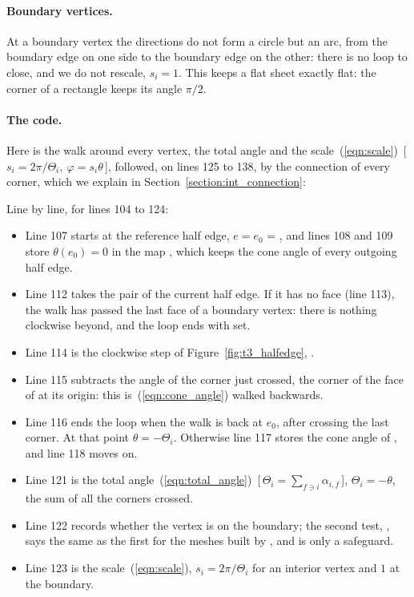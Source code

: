 \paragraph{Boundary vertices.} At a boundary vertex the directions do not form a circle but an arc, from the boundary edge on one side to the boundary edge on the other: there is no loop to close, and we do not rescale, $s_i = 1$. This keeps a flat sheet exactly flat: the corner of a rectangle keeps its angle $\pi/2$.

\paragraph{The code.} Here is the walk around every vertex, the total angle and the scale~(\ref{eqn:scale})~[\,$s_i = 2\pi/\Theta_i,\ \varphi = s_i\theta$\,], followed, on lines 125 to 138, by the connection of every corner, which we explain in Section~\ref{section:int_connection}:

Line by line, for lines 104 to 124:
\begin{itemize}
\item Line 107 starts at the reference half edge, $e = e_0$ = , and lines 108 and 109 store $\theta(e_0) = 0$ in the map , which keeps the cone angle of every outgoing half edge.
\item Line 112 takes the pair of the current half edge. If it has no face (line 113), the walk has passed the last face of a boundary vertex: there is nothing clockwise beyond, and the loop ends with  set.
\item Line 114 is the clockwise step of Figure~\ref{fig:t3_halfedge}, .
\item Line 115 subtracts the angle of the corner just crossed, the corner of the face of  at its origin: this is~(\ref{eqn:cone_angle}) walked backwards.
\item Line 116 ends the loop when the walk is back at $e_0$, after crossing the last corner. At that point $\theta = -\Theta_i$. Otherwise line 117 stores the cone angle of , and line 118 moves on.
\item Line 121 is the total angle~(\ref{eqn:total_angle})~[\,$\Theta_i = \sum_{f\ni i}\alpha_{i,f}$\,], $\Theta_i = -\theta$, the sum of all the corners crossed.
\item Line 122 records whether the vertex is on the boundary; the second test, , says the same as the first for the meshes built by , and is only a safeguard.
\item Line 123 is the scale~(\ref{eqn:scale}), $s_i = 2\pi/\Theta_i$ for an interior vertex and $1$ at the boundary.
\end{itemize}


